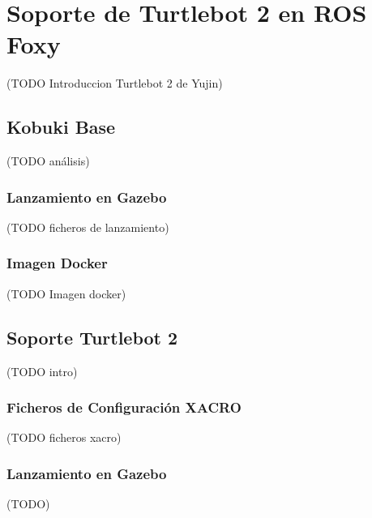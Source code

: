 \chapter{Soporte de Turtlebot 2 en ROS Foxy}
\label{cap:capitulo4}

(TODO Introduccion Turtlebot 2 de Yujin)

\section{Kobuki Base}
\label{sec:kobuki_base}

(TODO análisis)

\subsection{Lanzamiento en Gazebo}
\label{sec:kobuki_gazebo}

(TODO ficheros de lanzamiento)

\subsection{Imagen Docker}
\label{sec:kobuki_base_docker}

(TODO Imagen docker)

\section{Soporte Turtlebot 2}
\label{sec:soporte_turtlebot2}

(TODO intro)

\subsection{Ficheros de Configuración XACRO}
\label{sec:turtlebot2_xacro}

(TODO ficheros xacro)

\subsection{Lanzamiento en Gazebo}
\label{sec:turtlebot2_gazebo}

(TODO)
